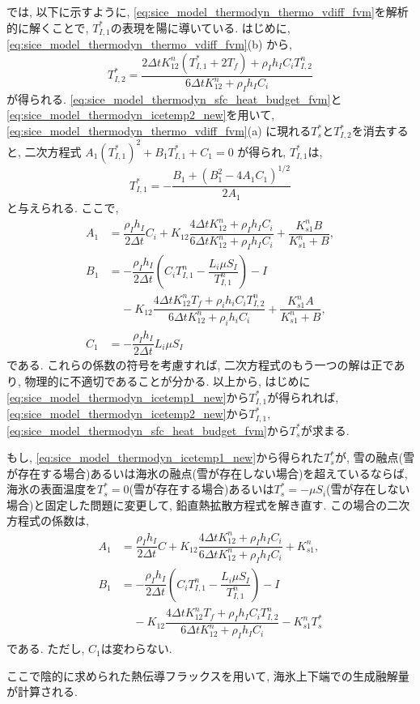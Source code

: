 \cite{winton2000reformulated}では,
以下に示すように, \eqref{eq:sice_model_thermodyn_thermo_vdiff_fvm}を解析的に解くことで,  
$T_{I,1}^*$の表現を陽に導いている. 
はじめに, \eqref{eq:sice_model_thermodyn_thermo_vdiff_fvm}(b) から, 
\begin{equation}
 T_{I,2}^* 
 = \dfrac{  2 \Delta t K^n_{12} (T_{I,1}^* + 2 T_f) 
          + \rho_I h_I C_i T_{I,2}^n}
          {6\Delta t K^n_{12} + \rho_I h_I C_i} 
\label{eq:sice_model_thermodyn_icetemp2_new}
\end{equation}
が得られる. 
\eqref{eq:sice_model_thermodyn_sfc_heat_budget_fvm}と\eqref{eq:sice_model_thermodyn_icetemp2_new}を用いて, 
\eqref{eq:sice_model_thermodyn_thermo_vdiff_fvm}(a)
に現れる$T_s^*$と$T_{I,2}^*$を消去すると, 
二次方程式
$A_1 (T_{I,1}^*)^2 + B_1 T_{I,1}^* + C_1 = 0$
が得られ, $T_{I,1}^*$は,
\begin{equation}
 T_{I,1}^* = - \dfrac{B_1 + (B_1^2 - 4 A_1 C_1)^{1/2}}{2 A_1}
\label{eq:sice_model_thermodyn_icetemp1_new}
\end{equation}
と与えられる.  
ここで, 
\begin{align*}
 A_1 
 &= 
   \dfrac{\rho_I h_I}{2\Delta t}C_i
 + K_{12}\dfrac{4\Delta t K^n_{12} + \rho_I h_I C_i}
               {6\Delta t K^n_{12} + \rho_I h_I C_i}
 + \dfrac{K^n_{s1} B}{K^n_{s1} + B}, \\
 B_1
 &= 
   - \dfrac{\rho_I h_I}{2\Delta t} 
       \left( C_i T_{I,1}^n - \dfrac{L_i\mu S_I}{T_{I,1}^n} \right) 
   - I \nonumber \\
 &\;\;\;\; - K_{12}\dfrac{4\Delta t K^n_{12} T_f + \rho_i h_i C_i T_{I,2}^n}
                 {6\Delta t K^n_{12} + \rho_i h_i C_i}
   + \dfrac{K^n_{s1} A}{K^n_{s1} + B}, \\
  C_1 
  &= - \dfrac{\rho_I h_I}{2\Delta t} L_i \mu S_I
\end{align*} 
である. 
これらの係数の符号を考慮すれば, 二次方程式のもう一つの解は正であり, 物理的に不適切であることが分かる.  
以上から, 
はじめに\eqref{eq:sice_model_thermodyn_icetemp1_new}から$T_{I,1}^*$が得られれば, 
\eqref{eq:sice_model_thermodyn_icetemp2_new}から$T_{I,1}^*$, 
\eqref{eq:sice_model_thermodyn_sfc_heat_budget_fvm}から$T_s^*$が求まる. 
 
もし, \eqref{eq:sice_model_thermodyn_icetemp1_new}から得られた$T_s^*$が,
雪の融点(雪が存在する場合)あるいは海氷の融点(雪が存在しない場合)を超えているならば, 
海氷の表面温度を$T_s^*=0$(雪が存在する場合)あるいは$T_s^*=-\mu S_i$(雪が存在しない場合)と固定した問題に変更して, 
鉛直熱拡散方程式を解き直す. 
この場合の二次方程式の係数は, 
\begin{align*}
 A_1 
 &= 
   \dfrac{\rho_I h_I}{2\Delta t}C 
 + K_{12}\dfrac{4\Delta t K^n_{12} + \rho_I h_I C_i}
               {6\Delta t K^n_{12} + \rho_I h_I C_i}
 + K_{s1}^n, \\
 B_1
 &= 
   - \dfrac{\rho_I h_I}{2\Delta t} 
       \left( C_i T_{I,1}^n - \dfrac{L_i\mu S_I}{T_{I,1}^n} \right) 
   - I \nonumber \\
 &\;\;\;\; - K_{12}\dfrac{4\Delta t K^n_{12} T_f + \rho_I h_I C_i T_{I,2}^n}
                 {6\Delta t K^n_{12} + \rho_I h_I C_i}
   - K_{s1}^n T_s^*
\end{align*}
である. 
ただし, $C_1$は変わらない. 

ここで陰的に求められた熱伝導フラックスを用いて, 海氷上下端での生成融解量が計算される. 

